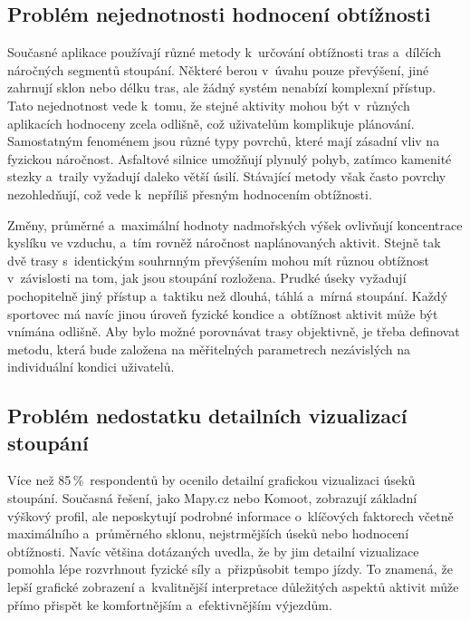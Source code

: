 \subsection{Problém nejednotnosti hodnocení obtížnosti}
\label{the-problem-of-inconsistency-in-difficulty-ratings}

Současné aplikace používají různé metody k~určování obtížnosti tras a~dílčích náročných segmentů stoupání.
Některé berou v~úvahu pouze převýšení, jiné zahrnují sklon nebo délku tras, ale žádný systém nenabízí komplexní přístup.
Tato nejednotnost vede k~tomu, že stejné aktivity mohou být v~různých aplikacích hodnoceny zcela odlišně, což uživatelům komplikuje plánování.
Samostatným fenoménem jsou různé typy povrchů, které mají zásadní vliv na fyzickou náročnost.
Asfaltové silnice umožňují plynulý pohyb, zatímco kamenité stezky a~traily vyžadují daleko větší úsilí.
Stávající metody však často povrchy nezohledňují, což vede k~nepříliš přesným hodnocením obtížnosti.

Změny, průměrné a~maximální hodnoty nadmořských výšek ovlivňují koncentrace kyslíku ve vzduchu, a~tím rovněž náročnost naplánovaných aktivit.
Stejně tak dvě trasy s~identickým souhrnným převýšením mohou mít různou obtížnost v~závislosti na tom, jak jsou stoupání rozložena.
Prudké úseky vyžadují pochopitelně jiný přístup a~taktiku než dlouhá, táhlá a~mírná stoupání.
Každý sportovec má navíc jinou úroveň fyzické kondice a~obtížnost aktivit může být vnímána odlišně.
Aby bylo možné porovnávat trasy objektivně, je třeba definovat metodu, která bude založena na měřitelných parametrech nezávislých na individuální kondici uživatelů.

\subsection{Problém nedostatku detailních vizualizací stoupání}
\label{the-problem-of-lack-of-detailed-visualisations-of-climbs}

Více než 85\,\%~respondentů by ocenilo detailní grafickou vizualizaci úseků stoupání.
Současná řešení, jako Mapy.cz nebo Komoot, zobrazují základní výškový profil, ale neposkytují podrobné informace o~klíčových faktorech včetně maximálního a~průměrného sklonu, nejstrmějších úseků nebo hodnocení obtížnosti.
Navíc většina dotázaných uvedla, že by jim detailní vizualizace pomohla lépe rozvrhnout fyzické síly a~přizpůsobit tempo jízdy.
To znamená, že lepší grafické zobrazení a~kvalitnější interpretace důležitých aspektů aktivit může přímo přispět ke komfortnějším a~efektivnějším výjezdům.

